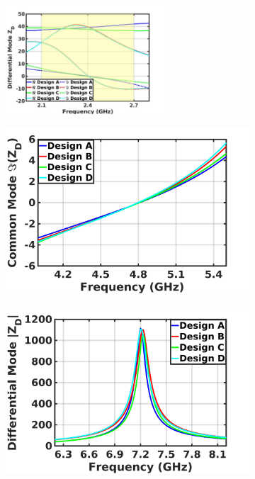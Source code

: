 \documentclass[conference]{IEEEtran}
\begin{document}
\begin{figure}[!t]
	\captionsetup{font=footnotesize}
	\centering
	\begin{subfigure}{0.5\textwidth}
		\centering
		\includegraphics[width=0.65\textwidth]{Images/Output_Network_Comp/Comp_1H.jpg}
		\caption{}
		\label{fig:Comp_1H}
	\end{subfigure}
	\begin{subfigure}{0.24\textwidth}
		\includegraphics[width=1\textwidth]{Images/Output_Network_Comp/Comp_2H_imag.jpg}
		\caption{}
		\label{fig:Comp_2H_imag}
	\end{subfigure}
	\begin{subfigure}{0.24\textwidth}
		\includegraphics[width=1\textwidth]{Images/Output_Network_Comp/Comp_3H_Mag.jpg}

\end{subfigure}
\end{figure}
\end{document}
